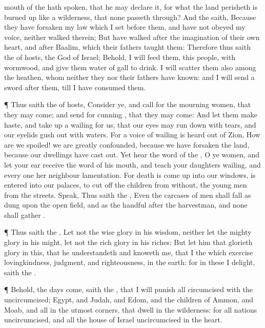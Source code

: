 {mouth of the
{} hath
spoken, that he may
declare it, for what the
land
perisheth
{} is burned
up like a
wilderness, that none passeth
through?
And the
{}
saith, Because they have
forsaken my
law which I
set
before them, and have not
obeyed my
voice, neither
walked therein;
But have
walked
after the
imagination of their own
heart, and
after
Baalim, which their
fathers
taught them:
Therefore thus
saith the
{} of
hosts, the
God of
Israel; Behold, I will
feed them,
{} this
people, with
wormwood, and give them
water of
gall to
drink.
I will
scatter them also among the
heathen, whom neither they nor their
fathers have
known: and I will
send a
sword
after them, till I have
consumed them.
\par }{\PP {}¶ Thus
saith the
{} of
hosts,
Consider ye, and
call for the mourning
women, that they may
come; and
send for
cunning
{}, that they may
come:
And let them make
haste, and take
up a
wailing for us, that our
eyes may run
down with
tears, and our
eyelids gush
out with
waters.
For a
voice of
wailing is
heard out of
Zion, How are we
spoiled! we are
greatly
confounded, because we have
forsaken the
land, because our
dwellings have cast
{}
out.
Yet
hear the
word of the
{}, O ye
women, and let your
ear
receive the
word of his
mouth, and
teach your
daughters
wailing, and every
one her
neighbour
lamentation.
For
death is come
up into our
windows,
{} is
entered into our
palaces, to cut
off the
children from
without,
{} the young
men from the
streets.
Speak, Thus
saith the
{}, Even the
carcases of
men shall
fall as
dung upon the
open
field, and as the
handful
after the
harvestman, and none shall
gather
{}.
\par }{\PP {}¶ Thus
saith the
{}, Let not the
wise
{}
glory in his
wisdom, neither let the
mighty
{}
glory in his
might, let not the
rich
{}
glory in his
riches:
But let him that
glorieth
glory in this, that he
understandeth and
knoweth me, that I
{} the
{} which
exercise
lovingkindness,
judgment, and
righteousness, in the
earth: for in these
{} I
delight,
saith the
{}.
\par }{\PP {}¶ Behold, the
days
come,
saith the
{}, that I will
punish all
{}
circumcised with the
uncircumcised;
Egypt, and
Judah, and
Edom, and the
children of
Ammon, and
Moab, and all
{} in the
utmost
corners, that
dwell in the
wilderness: for all
{}
nations
{}
uncircumcised, and all the
house of
Israel
{}
uncircumcised in the
heart.

}
